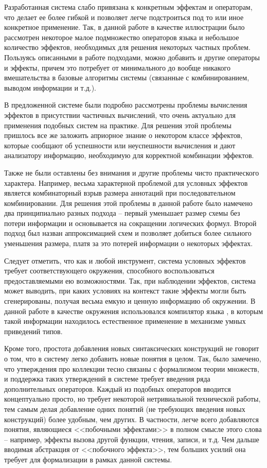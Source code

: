 Разработанная система слабо привязана к конкретным эффектам и операторам, что делает ее более гибкой и позволяет легче подстроиться под то или иное конкретное применение. Так, в данной работе в качестве иллюстрации было рассмотрен некоторое малое подмножество операторов языка  и небольшое количество эффектов, необходимых для решения некоторых частных проблем. Пользуясь описанными в работе подходами, можно добавить и другие операторы и эффекты, причем это потребует от минимального до вообще никакого вмешательства в базовые алгоритмы системы (связанные с комбинированием, выводом информации и т.д.). 

В предложенной системе были подробно рассмотрены проблемы вычисления эффектов в присутствии частичных вычислений, что очень актуально для применения подобных систем на практике. Для решения этой проблемы пришлось все же заложить априорное знание о некотором классе эффектов, которые сообщают об успешности или неуспешности вычисления и дают анализатору информацию, необходимую для корректной комбинации эффектов. 

Также не были оставлены без внимания и другие проблемы чисто практического характера. Например, весьма характерной проблемой для условных эффектов является комбинаторный взрыв размера аннотаций при последовательном комбинировании. Для решения этой проблемы в данной работе было намечено два принципиально разных подхода -- первый уменьшает размер схемы без потери информации и основывается на сокращении логических формул. Второй подход был назван аппроксимацией схем и позволяет добиться более сильного уменьшения размера, платя за это потерей информации о некоторых эффектах.

Следует отметить, что как и любой инструмент, система условных эффектов требует соответствующего окружения, способного воспользоваться предоставляемыми ею возможностями. Так, при наблюдении эффектов, система может выводить, при каких условиях на контекст такие эффекты могли быть сгенерированы, получая весьма емкую и ценную информацию об окружении. В данной работе в качестве окружения использовался компилятор языка , в которым такой информации находилось естественное применение в механизме умных приведений типов.

Кроме того, простота добавления новых синтаксических конструкций не говорит о том, что в систему легко добавить новые понятия в целом. Так, было замечено, что утверждения про коллекции тесно связаны с формализмом теории множеств, и поддержка таких утверждений в системе требует введения ряда дополнительных операторов. Каждый из подобных операторов вводится концептуально просто, но требует некоторой нетривиальной технической работы, тем самым делая добавление одних понятий (не требующих введения новых конструкций) более удобным, чем других. В частности, легче всего добавляются понятия, являющиеся <<побочными эффектами>> в полном смысле этого слова -- например, эффекты вызова другой функции, чтения, записи, и т.д. Чем дальше вводимая абстракция от <<побочного эффекта>>, тем больших усилий она требует для формализации в рамках данной системы.



